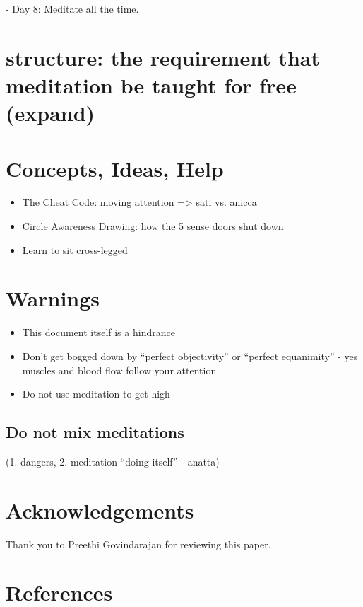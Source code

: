 \documentclass[a4paper, amsfonts, amssymb, amsmath, reprint, showkeys, nofootinbib, twoside]{revtex4-1}
\begin{document}
- Day 8: Meditate all the time.

\section{structure: the requirement that meditation be taught for free (expand)}


\section{Concepts, Ideas, Help}

\begin{itemize}
  \item The Cheat Code: moving attention => sati vs. anicca
  \item Circle Awareness Drawing: how the 5 sense doors shut down
  \item Learn to sit cross-legged
\end{itemize}


\section{Warnings}

\begin{itemize}
  \item This document itself is a hindrance
  \item Don't get bogged down by ``perfect objectivity'' or ``perfect equanimity'' - yes muscles and blood flow follow your attention
  \item Do not use meditation to get high
\end{itemize}

\subsection{Do not mix meditations}

(1. dangers, 2. meditation ``doing itself'' - anatta)


\section*{Acknowledgements}

Thank you to Preethi Govindarajan for reviewing this paper.


\section*{References}
\end{document}
